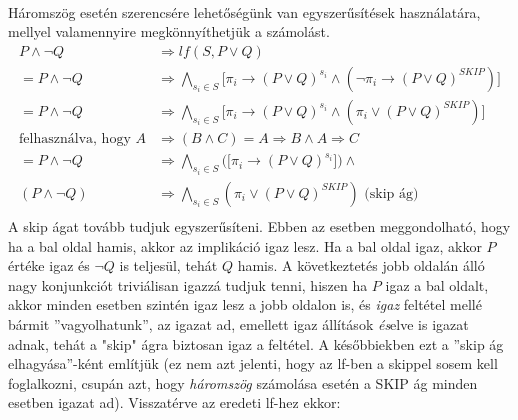 \documentclass[12pt]{article}
\begin{document}
\paragraph{}Háromszög esetén szerencsére lehetőségünk van egyszerűsítések használatára, mellyel valamennyire megkönnyíthetjük a számolást.
\begin{align*}
    P \land \neg Q &\Rightarrow lf(S,P \lor Q) \\
    = P \land \neg Q &\Rightarrow \bigwedge_{s_i \in S} \big[\pi_i \rightarrow (P \lor Q)^{s_i} \land (\neg \pi_i \rightarrow (P \lor Q)^{SKIP})\big] \\
    = P \land \neg Q &\Rightarrow \bigwedge_{s_i \in S} \big[\pi_i \rightarrow (P \lor Q)^{s_i} \land (\pi_i \lor (P \lor Q)^{SKIP})\big] \\
    \text{felhasználva, hogy } A &\Rightarrow (B \land C) = A \Rightarrow B \land A \Rightarrow C\\
    = P \land \neg Q &\Rightarrow \bigwedge_{s_i \in S}  \big(\big[\pi_i \rightarrow (P \lor Q)^{s_i}\big]\big) \land \\
    (P \land \neg Q) &\Rightarrow \bigwedge_{s_i \in S} (\pi_i \lor (P \lor Q)^{SKIP}) \text{ (skip ág)} \\
\end{align*} A skip ágat tovább tudjuk egyszerűsíteni.
    Ebben az esetben meggondolható, hogy ha a bal oldal hamis, akkor az implikáció igaz lesz. Ha a bal oldal igaz, akkor $P$ értéke igaz és $\neg Q$ is teljesül, tehát $Q$ hamis. A következtetés jobb oldalán álló nagy konjunkciót triviálisan igazzá tudjuk tenni, hiszen ha $P$ igaz a bal oldalt, akkor  minden esetben szintén igaz lesz a jobb oldalon is, és \textit{igaz} feltétel mellé bármit ''vagyolhatunk'', az igazat ad, emellett igaz állítások \textit{és}elve is igazat adnak, tehát a "skip" ágra biztosan igaz a feltétel. A későbbiekben ezt a ''skip ág elhagyása''-ként említjük (ez nem azt jelenti, hogy az lf-ben a skippel sosem kell foglalkozni, csupán azt, hogy \textit{háromszög} számolása esetén a SKIP ág minden esetben igazat ad). Visszatérve az eredeti lf-hez ekkor:
    
\end{document}
